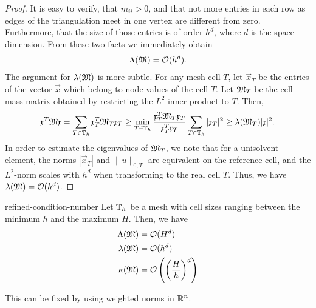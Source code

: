 \begin{proof}
  It is easy to verify, that $m_{ii}> 0$, and that not more
  entries in each row as edges of the triangulation meet in one vertex
  are different from zero. Furthermore, that the size of those entries
  is of order $h^d$, where $d$ is the space dimension. From these two
  facts we immediately obtain
  \begin{gather*}
    \Lambda(\mathfrak{M}) = \mathcal O(h^{d}).
  \end{gather*}
  The argument for $\lambda(\mathfrak{M})$ is more subtle. For any mesh cell
  $T$, let $\vec x_T$ be the entries of the vector $\vec x$ which
  belong to node values of the cell $T$. Let $\mathfrak{M}_T$ be the cell
  mass matrix obtained by restricting the $L^2$-inner product to
  $T$. Then,
  \begin{gather*}
    \mathfrak{x}^T \mathfrak{M} \mathfrak{x}
    = \sum_{T\in\mathbb T_h} \mathfrak{x}^T_T \mathfrak{M}_T \mathfrak{x}_T
    \ge \min_{T\in\mathbb T_h} \frac{\mathfrak{x}^T_T \mathfrak{M}_T \mathfrak{x}_T}{\mathfrak{x}^T_T\mathfrak{x}_T}
    \sum_{T\in\mathbb T_h} |\mathfrak{x}_T|^2 \ge \lambda(\mathfrak{M}_T)  |\mathfrak{x}|^2.
  \end{gather*}
  In order to estimate the eigenvalues of $\mathfrak{M}_T$, we note that for
  a unisolvent element, the norms $|\vec x_T|$ and $\|u\|_{0,T}$ are
  equivalent on the reference cell, and the $L^2$-norm scales with
  $h^d$ when transforming to the real cell $T$. Thus, we have
  $\lambda(\mathfrak{M}) = \mathcal O(h^{d})$.
\end{proof}

\begin{Corollary}{refined-condition-number}
  Let $\mathbb T_h$ be a mesh with cell sizes ranging between the minimum $h$ and
  the maximum $H$. Then, we have
  \begin{align*}
    \Lambda(\mathfrak{M}) &= \mathcal O(H^{d}) \\
    \lambda(\mathfrak{M}) &= \mathcal O(h^{d}) \\
    \kappa(\mathfrak{M}) &= \mathcal O\left(\left(\frac Hh\right)^{d}\right)
  \end{align*}
\end{Corollary}

\begin{todo}
  This can be fixed by using weighted norms in $\mathbb R^n$.
\end{todo}

